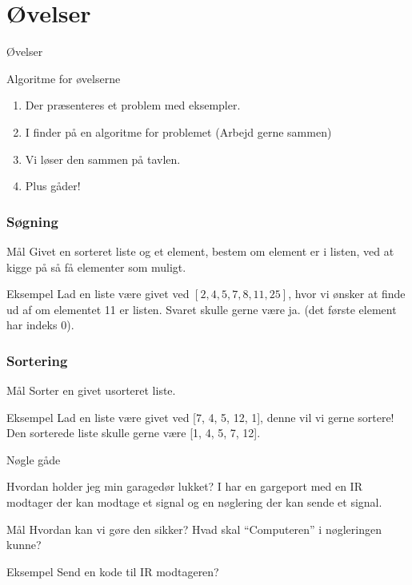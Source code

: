 \documentclass[12pt,t]{beamer}
\begin{document}
\section{Øvelser}
\begin{frame}[t]{Øvelser}
  \begin{block}{Algoritme for øvelserne}
    \begin{enumerate}
      \item Der præsenteres et problem med eksempler. \pause
      \item I finder på en algoritme for problemet
            (Arbejd gerne sammen) \pause
      \item Vi løser den sammen på tavlen. \pause
      \item Plus gåder!
    \end{enumerate}
  \end{block}
\end{frame}

\begin{frame}
  \frametitle{Søgning}
  \begin{block}{Mål}
    Givet en sorteret liste og et element, bestem om element er i listen,
    ved at kigge på så få elementer som muligt.
  \end{block}
  \pause

  \begin{exampleblock}{Eksempel}
    Lad en liste være givet ved $[2, 4, 5, 7, 8, 11, 25]$, hvor vi ønsker at
    finde ud af om elementet 11 er listen. Svaret skulle gerne være ja.
    (det første element har indeks 0).
  \end{exampleblock}
\end{frame}

\begin{frame}
  \frametitle{Sortering}
  \begin{block}{Mål}
    Sorter en givet usorteret liste.
  \end{block}
  \pause

  \begin{exampleblock}{Eksempel}
    Lad en liste være givet ved [7, 4, 5, 12, 1], denne vil vi gerne sortere!
    Den sorterede liste skulle gerne være [1, 4, 5, 7, 12].
  \end{exampleblock}
\end{frame}


\begin{frame}{Nøgle gåde}
  \begin{block}{Hvordan holder jeg min garagedør lukket?}
    I har en gargeport med en IR modtager der kan modtage et
    signal og en nøglering der kan sende et signal.
  \end{block}\pause
  \begin{block}{Mål}
    Hvordan kan vi gøre den sikker? Hvad skal ``Computeren'' i
    nøgleringen kunne?
  \end{block}
  \pause
  \begin{exampleblock}{Eksempel}
    Send en kode til IR modtageren?
  \end{exampleblock}
\end{frame}
\end{document}
